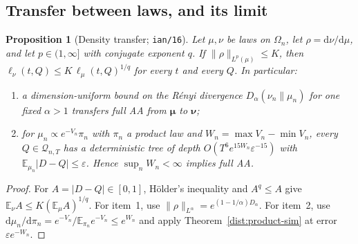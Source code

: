 \documentclass[11pt]{article}
\newtheorem{proposition}[theorem]{Proposition}
\theoremstyle{definition}\newtheorem{definition}[theorem]{Definition}
\theoremstyle{remark}\newtheorem{remark}[theorem]{Remark}
\newcommand{\E}{\mathbb E}\newcommand{\Prb}{\mathbb P}
\newcommand{\mc}{\mathcal}\newcommand{\eps}{\varepsilon}
\newcommand{\dd}{\mathrm d}\newcommand{\set}[1]{\left\{#1\right\}}
\begin{document}
\subsection{Transfer between laws, and its limit}\label{dist:transfer}
\begin{proposition}[Density transfer; \texttt{ian/16}]\label{dist:lp-transfer}
Let \(\mu,\nu\) be laws on \(\Omega_n\), let \(\rho=\dd\nu/\dd\mu\), and let
\(p\in(1,\infty]\) with conjugate exponent \(q\). If
\(\|\rho\|_{L^p(\mu)}\le K\), then
\(\ell_\nu(t,Q)\le K\,\ell_\mu(t,Q)^{1/q}\) for every \(t\) and every \(Q\). In
particular:
\begin{enumerate}
\item a dimension-uniform bound on the Rényi divergence \(D_\alpha(\nu_n\|\mu_n)\)
for one fixed \(\alpha>1\) transfers full AA from \(\boldsymbol\mu\) to
\(\boldsymbol\nu\);
\item for \(\mu_n\propto e^{-V_n}\pi_n\) with \(\pi_n\) a product law and
\(W_n=\max V_n-\min V_n\), every \(Q\in\mc Q_{n,T}\) has a deterministic tree of
depth \(O(T^6e^{15W_n}\eps^{-15})\) with \(\E_{\mu_n}|D-Q|\le\eps\). Hence
\(\sup_nW_n<\infty\) implies full AA.
\end{enumerate}
\end{proposition}
\begin{proof}
For \(A=|D-Q|\in[0,1]\), Hölder's inequality and \(A^q\le A\) give
\(\E_\nu A\le K(\E_\mu A)^{1/q}\). For item~1, use
\(\|\rho\|_{L^\alpha}=e^{(1-1/\alpha)D_\alpha}\). For item~2, use
\(\dd\mu_n/\dd\pi_n=e^{-V_n}/\E_{\pi_n}e^{-V_n}\le e^{W_n}\) and apply
Theorem~\ref{dist:product-sim} at error \(\eps e^{-W_n}\).
\end{proof}
\end{document}
